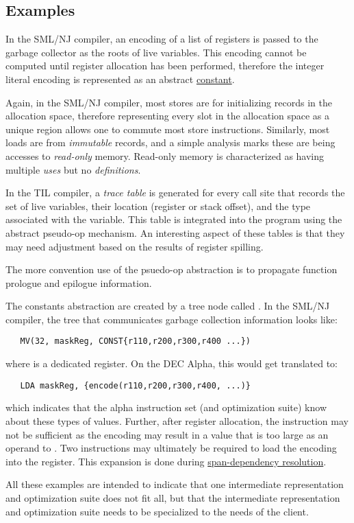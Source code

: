 \subsection{Examples}
   
   In the SML/NJ compiler, an encoding of a list of registers
   is passed to the garbage collector as the roots of live
   variables. This encoding cannot be computed until register
   allocation has been performed, therefore the integer literal
   encoding is represented as an abstract 
   \href{constants.html}{constant}.

    Again, in the SML/NJ compiler, most stores are for initializing 
   records in the allocation space, therefore representing every slot in
   the allocation space as a unique region allows one to commute
   most store instructions. Similarly, most loads are from
   \emph{immutable} records, and a simple analysis marks these are
   being accesses to \emph{read-only} memory. Read-only memory is
   characterized as having multiple \emph{uses} but no
   \emph{definitions}.

    In the TIL compiler, a \emph{trace table} is generated for
   every call site that records the set of live variables, their
   location (register or stack offset), and the type associated with
   the variable. This table is integrated into the program using the
   abstract pseudo-op mechanism. An interesting aspect of these tables
   is that they may need adjustment based on the results of register
   spilling.

    The more convention use of the psuedo-op abstraction is to
   propagate function prologue and epilogue information.

    The constants abstraction are created by a tree node called
   . In the SML/NJ compiler, the tree that communicates
   garbage collection information looks like:

\begin{verbatim}
   MV(32, maskReg, CONST{r110,r200,r300,r400 ...})
\end{verbatim}

  where  is a dedicated register. On the DEC Alpha,
  this would get translated to:

\begin{verbatim}
   LDA maskReg, {encode(r110,r200,r300,r400, ...)}
\end{verbatim}

   which indicates that the alpha instruction set (and optimization
   suite) know about these types of values. Further, after
   register allocation, the  instruction may not be
   sufficient as the encoding may result in a value that is too large
   as an operand to . Two instructions may ultimately be
   required to load the encoding into the 
   register. This expansion is done during 
   \href{span-dep.html}{span-dependency resolution}.

    All these examples are intended to indicate that one
   intermediate representation and optimization suite does not fit
   all, but that the intermediate representation and optimization
   suite needs to be specialized to the needs of the client.
